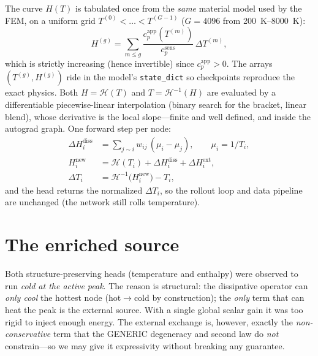 \documentclass[11pt]{article}
\newcommand{\cpapp}{c_p^{\mathrm{app}}}
\newcommand{\cpsens}{c_p^{\mathrm{sens}}}
\theoremstyle{definition}
\begin{document}
The curve $H(T)$ is tabulated once from the \emph{same} material model used by the FEM,
on a uniform grid $T^{(0)}<\dots<T^{(G-1)}$ ($G=4096$ from \SIrange{200}{8000}{K}):
\begin{equation}
  H^{(g)} = \sum_{m\le g}\frac{\cpapp(T^{(m)})}{\cpsens}\,\Delta T^{(m)} ,
\end{equation}
which is strictly increasing (hence invertible) since $\cpapp>0$. The arrays
$(T^{(g)},H^{(g)})$ ride in the model's \texttt{state\_dict} so checkpoints reproduce the
exact physics. Both $H=\mathcal H(T)$ and $T=\mathcal H^{-1}(H)$ are evaluated by a
differentiable piecewise-linear interpolation (binary search for the bracket, linear
blend), whose derivative is the local slope---finite and well defined, and inside the
autograd graph. One forward step per node:
\begin{align}
  \Delta H_i^{\mathrm{diss}}
    &= \sum_{j\sim i} w_{ij}\,(\mu_i-\mu_j),
       \qquad \mu_i=1/T_i,
       \label{eq:dHdiss}\\
  H_i^{\mathrm{new}}
    &= \mathcal H(T_i) + \Delta H_i^{\mathrm{diss}} + \Delta H_i^{\mathrm{ext}},
       \label{eq:Hupdate}\\
  \Delta T_i
    &= \mathcal H^{-1}\!\big(H_i^{\mathrm{new}}\big) - T_i,
       \label{eq:dT}
\end{align}
and the head returns the normalized $\Delta T_i$, so the rollout loop and data pipeline
are unchanged (the network still rolls temperature).

\section{The enriched source}
\label{sec:enriched}

Both structure-preserving heads (temperature and enthalpy) were observed to run
\emph{cold at the active peak}. The reason is structural: the dissipative operator can
\emph{only cool} the hottest node (hot$\to$cold by construction); the \emph{only} term
that can heat the peak is the external source. With a single global scalar gain it was
too rigid to inject enough energy. The external exchange is, however, exactly the
\emph{non-conservative} term that the GENERIC degeneracy and second law do \emph{not}
constrain---so we may give it expressivity without breaking any guarantee.
\end{document}
